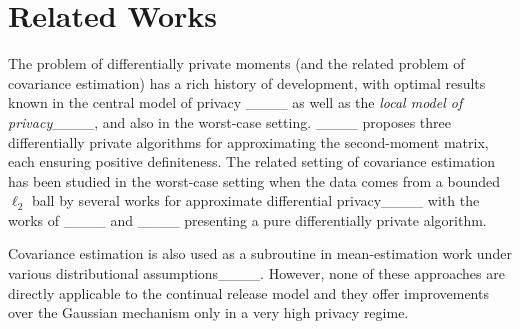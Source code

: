 \section{Related Works}
The problem of differentially private moments (and the related problem of covariance estimation) has a rich history of development, with optimal results known in the central model of privacy ____ as well as the \emph{local model of privacy}____, and also in the worst-case setting. ____ proposes three differentially private algorithms for approximating the second-moment matrix, each ensuring positive definiteness. The related setting of covariance estimation has been studied in the worst-case setting when the data comes from a bounded $\ell_2$ ball by several works for approximate differential privacy____ with the works of ____ and ____ presenting a pure differentially private algorithm. %

Covariance estimation is also used as a subroutine in mean-estimation work under various distributional assumptions____.  %
However, none of these approaches are directly applicable to the continual release model 
and they offer improvements over the Gaussian mechanism only in a very high privacy regime.